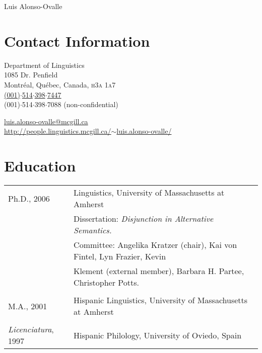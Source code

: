 \documentclass[11pt]{article}
\begin{document}
\markright{}
\thispagestyle{plain}
\author{}
\vspace{-2cm}
\begin{center}
{\LARGE Luis Alonso-Ovalle}
\end{center}

\vspace{.4cm}


\section*{Contact Information}
\begin{multicols}{2}
Department of Linguistics\\
1085 Dr. Penfield\\
Montr\'eal, Qu\'ebec, Canada, \textsc{h3a 1a7}\\
\Telefon \hspace{2pt} \href{tel:0015143984353}{(001)$\cdot$514$\cdot$398$\cdot$7447}
\\
\hspace{1pt} \FAX \hspace{1pt} (001)$\cdot$514$\cdot$398$\cdot$7088
(non-confidential) \\
\end{multicols}
\vspace{-12pt}
\Letter \hspace{3pt}  \href{mailto:luis.alonso-ovalle@mcgill.ca}{luis.alonso-ovalle@mcgill.ca}\\
\ComputerMouse \hspace{6pt}
\href{http://people.linguistics.mcgill.ca/~luis.alonso-ovalle/}{http://people.linguistics.mcgill.ca/$\sim$luis.alonso-ovalle/}



\section*{Education}

\begin{tabular}{p{2.815cm}p{280pt}}
Ph.D., 2006 &  Linguistics, University of Massachusetts at Amherst\\
 & {\footnotesize Dissertation: \textit{Disjunction in Alternative Semantics.}}\\
 &  {\footnotesize Committee: Angelika Kratzer (chair), Kai von Fintel, Lyn Frazier,
Kevin}\\
& {\footnotesize Klement (external member), Barbara H. Partee, Christopher Potts.}\\
&  \\[-8pt]
M.A., 2001   & Hispanic Linguistics, University of Massachusetts at Amherst\\
 &  \\[-8pt]
\textit{Licenciatura}, 1997  & Hispanic Philology,  University of Oviedo, Spain\\
\end{tabular}
\end{document}
